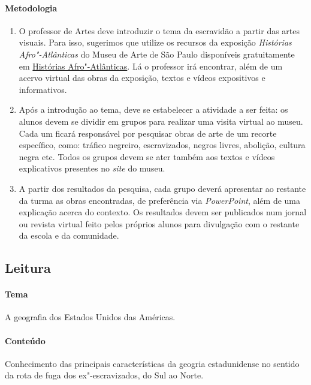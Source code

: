 \documentclass[11pt]{extarticle}
\begin{document}
 \paragraph{Metodologia}
   \begin{enumerate}
    \item
    O professor de Artes deve introduzir o tema da escravidão a partir das 
    artes visuais. Para isso, sugerimos que utilize os recursos da exposição
    \emph{Histórias Afro"-Atlânticas} do Museu de Arte de São Paulo disponíveis 
    gratuitamente em \href{https://masp.org.br/exposicoes/historias-afro-atlanticas}{Histórias Afro"-Atlânticas}.
    Lá o professor irá encontrar, além de um acervo virtual das obras da exposição,
    textos e vídeos expositivos e informativos.

    \item
    Após a introdução ao tema, deve se estabelecer a atividade a ser feita: os alunos
    devem se dividir em grupos para realizar uma visita virtual ao museu. 
    Cada um ficará responsável por pesquisar obras de arte de um recorte específico,
    como: tráfico negreiro, escravizados, negros livres, abolição, cultura negra etc.
    Todos os grupos devem se ater também aos textos e vídeos explicativos presentes 
    no \emph{site} do museu.

    \item
    A partir dos resultados da pesquisa, cada grupo deverá apresentar ao
    restante da turma as obras encontradas, de preferência via \emph{PowerPoint}, 
    além de uma explicação acerca do contexto. Os resultados devem ser publicados
    num jornal ou revista virtual feito pelos próprios alunos para divulgação
    com o restante da escola e da comunidade.

   \end{enumerate}
 
\subsection{Leitura}

 \paragraph{Tema} A geografia dos Estados Unidos das Américas.

 \paragraph{Conteúdo} Conhecimento das principais características
 da geogria estadunidense no sentido da rota de fuga dos ex"-escravizados,
 do Sul ao Norte. 
\end{document}
